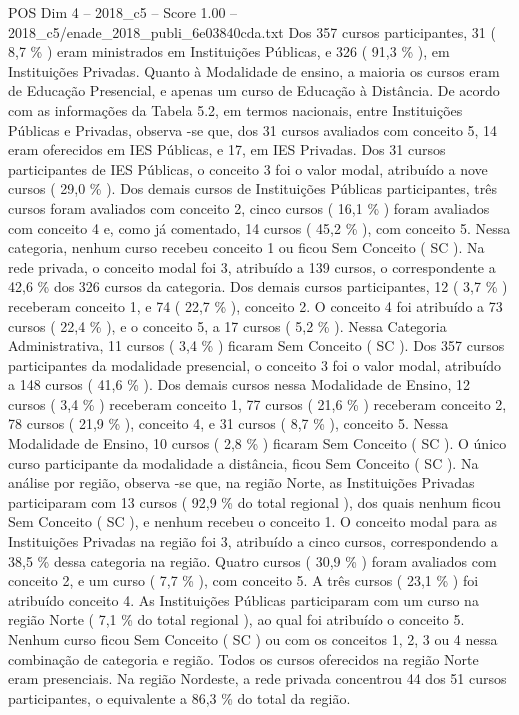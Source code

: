\begin{textsample}{POS Dim 4 – 2018\_c5 – Score 1.00 – 2018\_c5/enade\_2018\_publi\_6e03840cda.txt}
Dos 357 cursos participantes, 31 ( 8,7 \% ) eram ministrados em Instituições Públicas, e 326 ( 91,3 \% ), em Instituições Privadas.
Quanto à Modalidade de ensino, a maioria os cursos eram de Educação Presencial, e apenas um curso de Educação à Distância.
De acordo com as informações da Tabela 5.2, em termos nacionais, entre Instituições Públicas e Privadas, observa -se que, dos 31 cursos avaliados com conceito 5, 14 eram oferecidos em IES Públicas, e 17, em IES Privadas.
Dos 31 cursos participantes de IES Públicas, o conceito 3 foi o valor modal, atribuído a nove cursos ( 29,0 \% ).
Dos demais cursos de Instituições Públicas participantes, três cursos foram avaliados com conceito 2, cinco cursos ( 16,1 \% ) foram avaliados com conceito 4 e, como já comentado, 14 cursos ( 45,2 \% ), com conceito 5.
Nessa categoria, nenhum curso recebeu conceito 1 ou ficou Sem Conceito ( SC ).
Na rede privada, o conceito modal foi 3, atribuído a 139 cursos, o correspondente a 42,6 \% dos 326 cursos da categoria.
Dos demais cursos participantes, 12 ( 3,7 \% ) receberam conceito 1, e 74 ( 22,7 \% ), conceito 2.
O conceito 4 foi atribuído a 73 cursos ( 22,4 \% ), e o conceito 5, a 17 cursos ( 5,2 \% ).
Nessa Categoria Administrativa, 11 cursos ( 3,4 \% ) ficaram Sem Conceito ( SC ).
Dos 357 cursos participantes da modalidade presencial, o conceito 3 foi o valor modal, atribuído a 148 cursos ( 41,6 \% ).
Dos demais cursos nessa Modalidade de Ensino, 12 cursos ( 3,4 \% ) receberam conceito 1, 77 cursos ( 21,6 \% ) receberam conceito 2, 78 cursos ( 21,9 \% ), conceito 4, e 31 cursos ( 8,7 \% ), conceito 5.
Nessa Modalidade de Ensino, 10 cursos ( 2,8 \% ) ficaram Sem Conceito ( SC ).
O único curso participante da modalidade a distância, ficou Sem Conceito ( SC ).
Na análise por região, observa -se que, na região Norte, as Instituições Privadas participaram com 13 cursos ( 92,9 \% do total regional ), dos quais nenhum ficou Sem Conceito ( SC ), e nenhum recebeu o conceito 1.
O conceito modal para as Instituições Privadas na região foi 3, atribuído a cinco cursos, correspondendo a 38,5 \% dessa categoria na região.
Quatro cursos ( 30,9 \% ) foram avaliados com conceito 2, e um curso ( 7,7 \% ), com conceito 5.
A três cursos ( 23,1 \% ) foi atribuído conceito 4.
As Instituições Públicas participaram com um curso na região Norte ( 7,1 \% do total regional ), ao qual foi atribuído o conceito 5.
Nenhum curso ficou Sem Conceito ( SC ) ou com os conceitos 1, 2, 3 ou 4 nessa combinação de categoria e região.
Todos os cursos oferecidos na região Norte eram presenciais.
Na região Nordeste, a rede privada concentrou 44 dos 51 cursos participantes, o equivalente a 86,3 \% do total da região.

\end{textsample}
